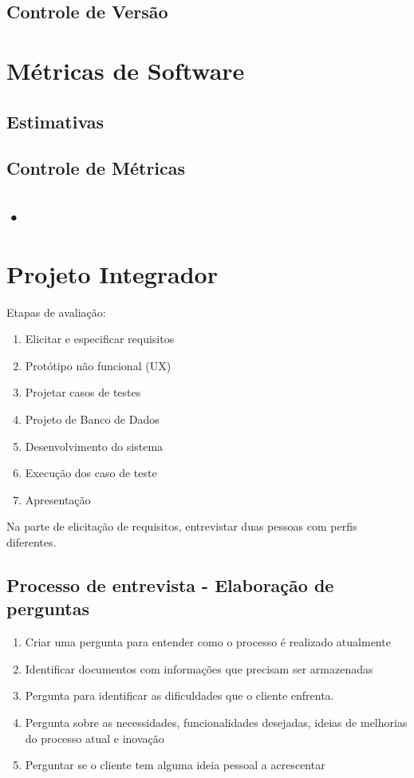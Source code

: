 \documentclass[ ]{article}
\begin{document}
		\subsection{Controle de Versão} %
	\section{Métricas de Software}
		\subsection{Estimativas}
		\subsection{Controle de Métricas}
		\subsection{•}%
	\section{Projeto Integrador}
		Etapas de avaliação:
		\begin{enumerate}
			\item Elicitar e especificar requisitos
			\item Protótipo não funcional (UX)
			\item Projetar casos de testes
			\item Projeto de Banco de Dados
			\item Desenvolvimento do sistema
			\item Execução dos caso de teste
			\item Apresentação
		\end{enumerate}
		Na parte de elicitação de requisitos, entrevistar duas pessoas com perfis diferentes.
		\subsection{Processo de entrevista - Elaboração de perguntas}
			\begin{enumerate}
				\item Criar uma pergunta para entender como o processo é realizado atualmente
				\item Identificar documentos com informações que precisam ser armazenadas
				\item Pergunta para identificar as dificuldades que o cliente enfrenta.
				\item Pergunta sobre as necessidades, funcionalidades desejadas, ideias de melhorias do processo atual e inovação
				\item Perguntar se o cliente tem alguma ideia pessoal a acrescentar
			\end{enumerate}
\end{document}
